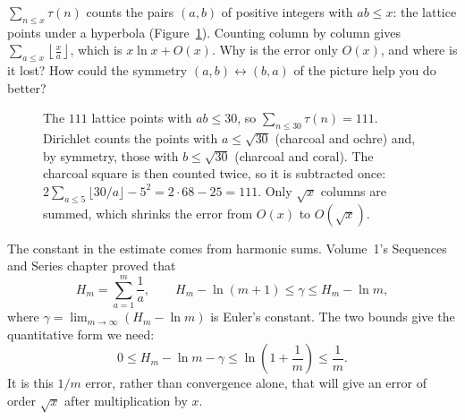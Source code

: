\begin{think}
$\sum_{n\le x}\tau(n)$ counts the pairs $(a,b)$ of positive integers with $ab\le x$: the lattice points under a hyperbola (Figure~\ref{fig:hyperbola}). Counting column by column gives $\sum_{a\le x}\left\lfloor\frac xa\right\rfloor$, which is $x\ln x+O(x)$. Why is the error only $O(x)$, and where is it lost? How could the symmetry $(a,b)\leftrightarrow(b,a)$ of the picture help you do better?
\end{think}

\begin{figure}[ht]
\centering
{}
\caption{The $111$ lattice points with $ab\le30$, so $\sum_{n\le30}\tau(n)=111$. Dirichlet counts the points with $a\le\sqrt{30}$ (charcoal and ochre) and, by symmetry, those with $b\le\sqrt{30}$ (charcoal and coral). The charcoal square is then counted twice, so it is subtracted once: $2\sum_{a\le5}\lfloor30/a\rfloor-5^2=2\cdot68-25=111$. Only $\sqrt x$ columns are summed, which shrinks the error from $O(x)$ to $O(\sqrt x)$.}
\label{fig:hyperbola}
\end{figure}

The constant in the estimate comes from harmonic sums. Volume~1's
Sequences and Series chapter proved that
\[
H_m=\sum_{a=1}^m\frac1a,\qquad
H_m-\ln(m+1)\le\gamma\le H_m-\ln m,
\]
where $\gamma=\lim_{m\to\infty}(H_m-\ln m)$ is Euler's constant.
The two bounds give the quantitative form we need:
\[
0\le H_m-\ln m-\gamma
\le\ln\left(1+\frac1m\right)\le\frac1m.
\]
It is this $1/m$ error, rather than convergence alone, that will give
an error of order $\sqrt x$ after multiplication by $x$.

